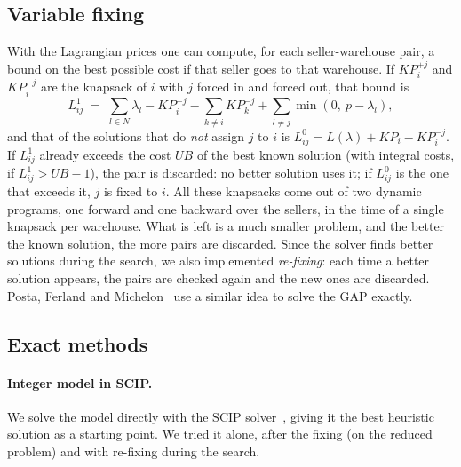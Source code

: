 \documentclass[11pt,a4paper]{article}
\begin{document}
\subsection{Variable fixing}
With the Lagrangian prices one can compute, for each seller-warehouse pair, a bound on the best
possible cost if that seller goes to that warehouse. If $KP_i^{+j}$ and $KP_i^{-j}$ are the
knapsack of $i$ with $j$ forced in and forced out, that bound is
\[
  L^1_{ij} \;=\; \sum_{l\in N}\lambda_l - KP_i^{+j} - \sum_{k\neq i} KP_k^{-j} + \sum_{l\neq j}\min(0,\ p-\lambda_l),
\]
and that of the solutions that do \emph{not} assign $j$ to $i$ is $L^0_{ij} = L(\lambda) + KP_i -
KP_i^{-j}$. If $L^1_{ij}$ already exceeds the cost $UB$ of the best known solution (with integral
costs, if $L^1_{ij} > UB-1$), the pair is discarded: no better solution uses it; if $L^0_{ij}$ is
the one that exceeds it, $j$ is fixed to $i$. All these knapsacks come out of two dynamic programs,
one forward and one backward over the sellers, in the time of a single knapsack per warehouse. What
is left is a much smaller problem, and the better the known solution, the more pairs are discarded.
Since the solver finds better solutions during the search, we also implemented \emph{re-fixing}:
each time a better solution appears, the pairs are checked again and the new ones are discarded.
Posta, Ferland and Michelon~\cite{posta2012} use a similar idea to solve the GAP exactly.

\subsection{Exact methods}
\paragraph{Integer model in SCIP.} We solve the model directly with the SCIP solver~\cite{scip},
giving it the best heuristic solution as a starting point. We tried it alone, after the fixing (on
the reduced problem) and with re-fixing during the search.
\end{document}
